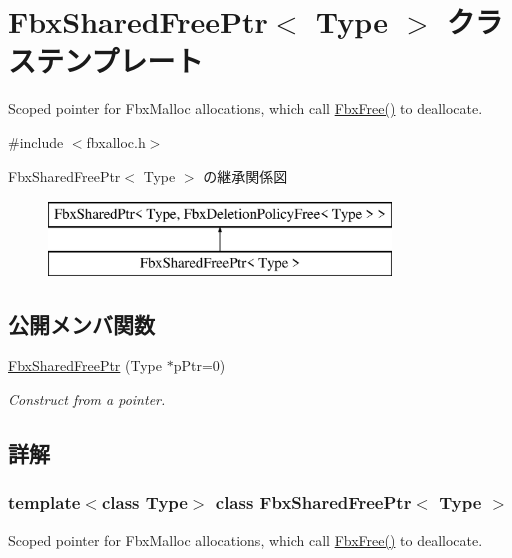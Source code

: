 \hypertarget{class_fbx_shared_free_ptr}{}\section{Fbx\+Shared\+Free\+Ptr$<$ Type $>$ クラステンプレート}
\label{class_fbx_shared_free_ptr}


Scoped pointer for Fbx\+Malloc allocations, which call \hyperlink{fbxalloc_8h_a8252906713d55f4c56e7ba84221d3852}{Fbx\+Free()} to deallocate.  




{\ttfamily \#include $<$fbxalloc.\+h$>$}

Fbx\+Shared\+Free\+Ptr$<$ Type $>$ の継承関係図\begin{figure}[H]
\begin{center}
\leavevmode
\includegraphics[height=2.000000cm]{class_fbx_shared_free_ptr}
\end{center}
\end{figure}
\subsection*{公開メンバ関数}
\begin{DoxyCompactItemize}
\item 
\hyperlink{class_fbx_shared_free_ptr_aed52ec1d3edb3564059995172aaf1de8}{Fbx\+Shared\+Free\+Ptr} (Type $\ast$p\+Ptr=0)
\begin{DoxyCompactList}\small\item\em Construct from a pointer. \end{DoxyCompactList}\end{DoxyCompactItemize}


\subsection{詳解}
\subsubsection*{template$<$class Type$>$\newline
class Fbx\+Shared\+Free\+Ptr$<$ Type $>$}

Scoped pointer for Fbx\+Malloc allocations, which call \hyperlink{fbxalloc_8h_a8252906713d55f4c56e7ba84221d3852}{Fbx\+Free()} to deallocate. 

